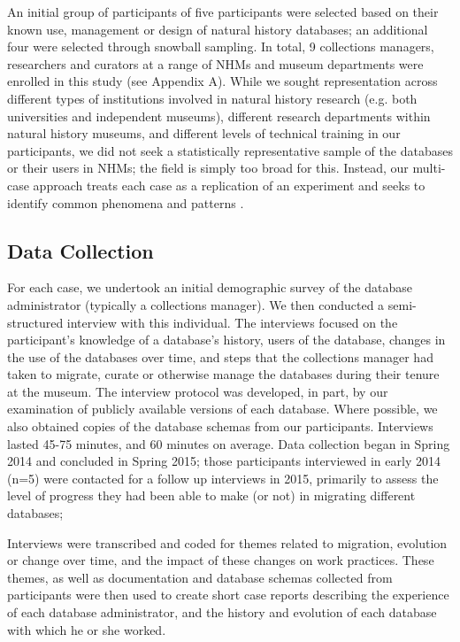 An initial group of participants of five participants were selected based on their known use, management or design of natural history databases; an additional four were selected through snowball sampling. In total, 9 collections managers, researchers and curators at a range of NHMs and museum departments were enrolled in this study (see Appendix A). While we sought representation across different types of institutions involved in natural history research (e.g. both universities and independent museums), different research departments within natural history museums, and different levels of technical training in our participants, we did not seek a statistically representative sample of the databases or their users in NHMs; the field is simply too broad for this. Instead, our multi-case approach treats each case as a replication of an experiment and seeks to identify common phenomena and patterns \cite{yin2013case}. 

\subsection{Data Collection}

For each case, we undertook an initial demographic survey of the database administrator (typically a collections manager). We then conducted a semi-structured interview with this individual. The interviews focused on the participant's knowledge of a database's history, users of the database, changes in the use of the databases over time, and steps that the collections manager had taken to migrate, curate or otherwise manage the databases during their tenure at the museum. The interview protocol was developed, in part, by our examination of publicly available versions of each database. Where possible, we also obtained copies of the database schemas from our participants. Interviews lasted 45-75 minutes, and 60 minutes on average. Data collection began in Spring 2014 and concluded in Spring 2015; those participants interviewed in early 2014 (n=5) were contacted for a follow up interviews in 2015, primarily to assess the level of progress they had been able to make (or not) in migrating different databases; 

Interviews were transcribed and coded for themes related to migration, evolution or change over time, and the impact of these changes on work practices. These themes, as well as documentation and database schemas collected from participants were then used to create short case reports describing the experience of each database administrator, and the history and evolution of each database with which he or she worked. 